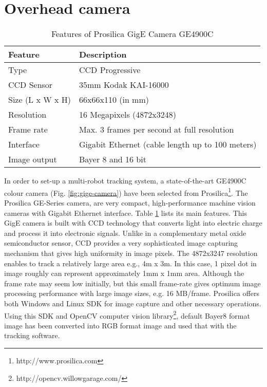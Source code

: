 \section{Overhead camera}
\begin{table}
\caption{Features of Prosilica GigE Camera GE4900C}
\label{table:ge4900c}
\begin{center}
\begin{tabular}{|l||l|}
\hline \textbf{Feature} & \textbf{Description}\\
\hline Type & CCD Progressive\\
\hline CCD Sensor & 35mm Kodak KAI-16000\\
\hline Size (L x W x H) & 66x66x110 (in mm)\\
\hline Resolution & 16 Megapixels (4872x3248)\\ 
\hline Frame rate & Max. 3 frames per second at full resolution\\
\hline Interface & Gigabit Ethernet (cable length up to 100 meters)\\
\hline Image output & Bayer 8 and 16 bit\\
\hline
\end{tabular}
\end{center}
\end{table}
In order to set-up a multi-robot tracking system, a state-of-the-art GE4900C colour camera (Fig. \ref{fig:gige-camera})  have been selected from Prosilica\footnote{http://www.prosilica.com}. The Prosilica GE-Series camera, are very compact, high-performance machine vision cameras with Gigabit Ethernet interface.  Table \ref{table:ge4900c} lists its main features. This GigE camera is built with \acf{CCD} technology that converts light into electric charge and process it into electronic signals. Unlike in a complementary metal oxide semiconductor sensor, CCD provides a very sophisticated image capturing mechanism that gives high uniformity in image pixels. The 4872x3247 resolution enables to track a relatively large area e.g., 4m x 3m. In this case, 1 pixel dot in image roughly can represent approximately 1mm x 1mm area. Although the frame rate may seem low initially, but this small frame-rate gives optimum image processing performance with large image sizes, e.g. 16 MB/frame. Prosilica offers both Windows and Linux \acf{SDK} for image capture and other necessary operations. Using this SDK and OpenCV computer vision library\footnote{http://opencv.willowgarage.com/},  default Bayer8 format image has been converted into RGB format image and used that with the tracking software.
